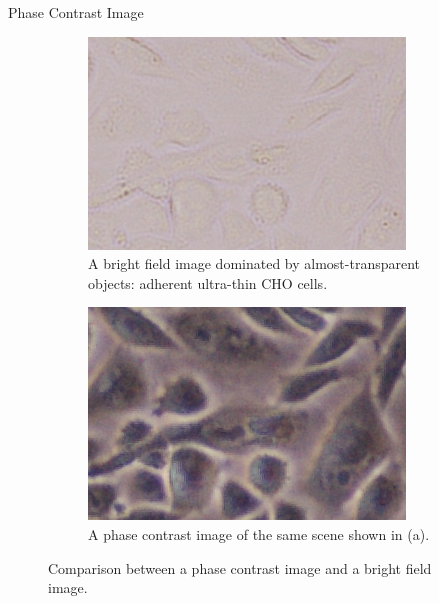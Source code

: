 \begin{frame}{Phase Contrast Image}
	\begin{figure}
		\begin{subfigure}[t]{0.45\textwidth}
			\includegraphics[width=\textwidth]{images/cells3bfp}
			\caption{A bright field image dominated by almost-transparent objects: adherent ultra-thin CHO cells.}
			\label{fig:mic:cells3bfp}
		\end{subfigure}
		\begin{subfigure}[t]{0.45\textwidth}
			\includegraphics[width=\textwidth]{images/cells3pc}
			\caption{A phase contrast image of the same scene shown in (a).}
			\label{fig:mic:cells3pc}
		\end{subfigure}%
		\caption{Comparison between a phase contrast image and a bright field image.}
		\label{fig:mic:cells3}
	\end{figure}

\end{frame}

